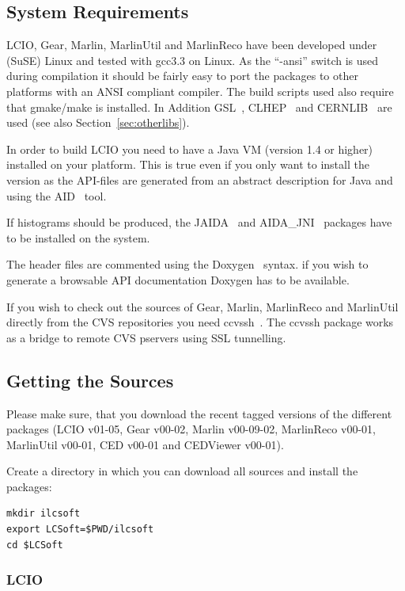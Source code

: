 \subsection{System Requirements}

LCIO, Gear, Marlin, MarlinUtil and MarlinReco have been 
developed under (SuSE) Linux and tested with gcc3.3 on Linux. 
As the ``-ansi'' switch is used during compilation
it should be fairly easy to 
port the packages to other platforms with an ANSI compliant \CPP{} compiler.
The build scripts used also require that gmake/make is installed.
In Addition GSL~\cite{ref_gsl}, CLHEP~\cite{ref_clhep} and 
CERNLIB~\cite{ref_cernlib} are used (see also Section~\ref{sec:otherlibs}).

In order to build LCIO you need to have a Java VM (version 1.4 or
higher) installed on your platform. This is true even if you only want
to install the \CPP{} version as the API-files are generated from an
abstract description for Java and \CPP{} using the AID~\cite{ref_aid} tool.

If histograms should be produced, the JAIDA~\cite{ref_jaida} and 
AIDA\_JNI~\cite{ref_aidajni} packages have 
to be installed on the system. 

The header files are commented using the Doxygen~\cite{ref_doxygen} syntax. 
if you wish to generate a browsable API documentation Doxygen 
has to be available.

If you wish to check out the sources of Gear, Marlin, MarlinReco
and MarlinUtil directly from the CVS repositories you need
ccvssh~\cite{ref_ccvssh}.
The ccvssh package works as a bridge to remote CVS
pservers using SSL tunnelling.  

\subsection{Getting the Sources}

Please make sure, that you download the recent tagged versions of the 
different packages (LCIO v01-05, Gear v00-02, Marlin v00-09-02, 
MarlinReco v00-01, MarlinUtil v00-01, CED v00-01 and CEDViewer v00-01). 

Create a directory in which you can download all sources and install 
the packages:

\begin{verbatim}
mkdir ilcsoft 
export LCSoft=$PWD/ilcsoft
cd $LCSoft
\end{verbatim}

\subsubsection*{LCIO}

